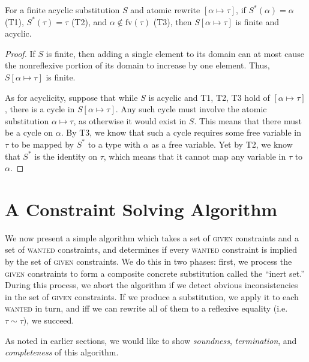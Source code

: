\documentclass[10pt, letterpaper, oneside]{article}
\newcommand{\fv}{\mathrm{fv}}
\begin{document}
\begin{lemma}
  \label{lemma:augment-sound}
  For a finite acyclic substitution \(S\) and atomic rewrite \([\alpha \mapsto \tau]\), if \(S^\ast(\alpha) = \alpha\) {\rm (T1)}, \(S^\ast(\tau) = \tau\) {\rm (T2)}, and \(\alpha \notin \fv(\tau)\) {\rm (T3)}, then \(S[\alpha \mapsto \tau]\) is finite and acyclic.
\end{lemma}

\begin{proof}
  If \(S\) is finite, then adding a single element to its domain can at most cause the nonreflexive portion of its domain to increase by one element. Thus, \(S[\alpha \mapsto \tau]\) is finite.

  As for acyclicity, suppose that while \(S\) is acyclic and T1, T2, T3 hold of \([\alpha \mapsto \tau]\), there is a cycle in \(S[\alpha \mapsto \tau]\). Any such cycle must involve the atomic substitution \(\alpha \mapsto \tau\), as otherwise it would exist in \(S\). This means that there must be a cycle on \(\alpha\). By T3, we know that such a cycle requires some free variable in \(\tau\) to be mapped by \(S^\ast\) to a type with \(\alpha\) as a free variable. Yet by T2, we know that \(S^\ast\) is the identity on \(\tau\), which means that it cannot map any variable in \(\tau\) to \(\alpha\).
\end{proof}



\section{A Constraint Solving Algorithm}

We now present a simple algorithm which takes a set of \textsc{given} constraints and a set of \textsc{wanted} constraints, and determines if every \textsc{wanted} constraint is implied by the set of \textsc{given} constraints. We do this in two phases: first, we process the \textsc{given} constraints to form a composite concrete substitution called the ``inert set.'' During this process, we abort the algorithm if we detect obvious inconsistencies in the set of \textsc{given} constraints. If we produce a substitution, we apply it to each \textsc{wanted} in turn, and iff we can rewrite all of them to a reflexive equality (i.e. \(\tau \sim \tau\)), we succeed.

As noted in earlier sections, we would like to show \emph{soundness}, \emph{termination}, and \emph{completeness} of this algorithm.
\end{document}
